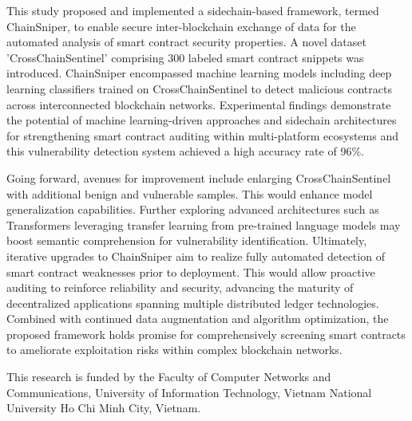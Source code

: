 \documentclass[sigconf]{acmart}
\begin{document}

This study proposed and implemented a sidechain-based framework, termed ChainSniper, to enable secure inter-blockchain exchange of data for the automated analysis of smart contract security properties. A novel dataset 'CrossChainSentinel' comprising 300 labeled smart contract snippets was introduced. ChainSniper encompassed machine learning models including deep learning classifiers trained on CrossChainSentinel to detect malicious contracts across interconnected blockchain networks. Experimental findings demonstrate the potential of machine learning-driven approaches and sidechain architectures for strengthening smart contract auditing within multi-platform ecosystems and this vulnerability detection system achieved a high accuracy rate of 96\%.

Going forward, avenues for improvement include enlarging CrossChainSentinel with additional benign and vulnerable samples. This would enhance model generalization capabilities. Further exploring advanced architectures such as Transformers leveraging transfer learning from pre-trained language models may boost semantic comprehension for vulnerability identification. Ultimately, iterative upgrades to ChainSniper aim to realize fully automated detection of smart contract weaknesses prior to deployment. This would allow proactive auditing to reinforce reliability and security, advancing the maturity of decentralized applications spanning multiple distributed ledger technologies. Combined with continued data augmentation and algorithm optimization, the proposed framework holds promise for comprehensively screening smart contracts to ameliorate exploitation risks within complex blockchain networks.

\begin{acks}
This research is funded by the Faculty of Computer Networks and Communications, University of Information Technology, Vietnam National University Ho Chi Minh City, Vietnam.
\end{acks}

\end{document}
